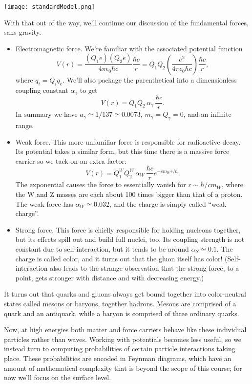 \documentclass[../p052main.tex]{subfiles}
\begin{document}
\begin{center}
    \texttt{[image: standardModel.png]}
\end{center}

With that out of the way, we'll continue our discussion of the fundamental forces, sans gravity.
\begin{itemize}
    \item Electromagnetic force.
    We're familiar with the associated potential function
    \[ V(r) = \frac{(Q_1 e)(Q_2 e)}{4\pi \epsilon_0 \hbar c} \frac{\hbar c}{r} = Q_1 Q_2 \left( \frac{e^2}{4\pi \epsilon_0 \hbar c} \right) \frac{\hbar c}{r}, \]
    where $q_i = Q_i q_e$.
    We'll also package the parenthetical into a dimensionless coupling constant $\alpha_\gamma$ to get
    \[ V(r) = Q_1 Q_2 \,\alpha_\gamma\, \frac{\hbar c}{r}. \]
    In summary we have $a_\gamma \simeq 1 / 137 \simeq 0.0073$, $m_\gamma = Q_\gamma = 0$, and an infinite range.

    \item Weak force.
    This more unfamiliar force is responsible for radioactive decay.
    Its potential takes a similar form, but this time there is a massive force carrier so we tack on an extra factor:
    \[ V(r) = Q_1^W Q_2^W \,\alpha_W\, \frac{\hbar c}{r} e^{-c m_W r / \hbar}. \]
    The exponential causes the force to essentially vanish for $r \sim \hbar / cm_W$, where the W and Z masses are each about 100 times bigger than that of a proton.
    The weak force has $\alpha_W \simeq 0.032$, and the charge is simply called ``weak charge''.

    \item Strong force.
    This force is chiefly responsible for holding nucleons together, but its effects spill out and build full nuclei, too.
    Its coupling strength is not constant due to self-interaction, but it tends to be around $\alpha_S \simeq 0.1$.
    The charge is called color, and it turns out that the gluon itself has color!
    (Self-interaction also leads to the strange observation that the strong force, to a point, gets stronger with distance and with decreasing energy.)
\end{itemize}
It turns out that quarks and gluons always get bound together into color-neutral states called mesons or baryons, together hadrons.
Mesons are comprised of a quark and an antiquark, while a baryon is comprised of three ordinary quarks.

Now, at high energies both matter and force carriers behave like these individual particles rather than waves.
Working with potentials becomes less useful, so we instead turn to computing probabilities of certain particle interactions taking place.
These probabilities are encoded in Feynman diagrams, which have an amount of mathematical complexity that is beyond the scope of this course; for now we'll focus on the surface level.
\end{document}

